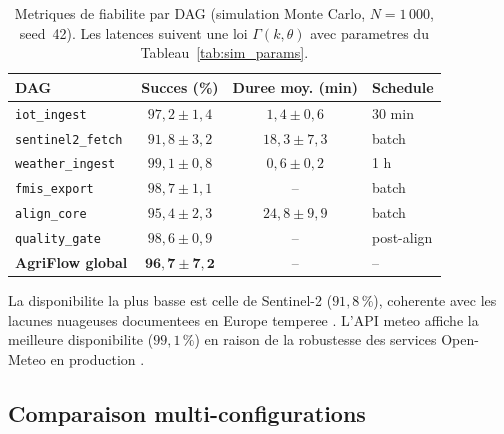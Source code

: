 \documentclass[12pt,a4paper]{article}
\theoremstyle{plain}
\theoremstyle{definition}
\theoremstyle{remark}
\begin{document}
	\begin{table}[H]
		\caption{Metriques de fiabilite par DAG (simulation Monte Carlo,
			$N=1\,000$, seed~42). Les latences suivent une loi
			$\Gamma(k,\theta)$ avec parametres du Tableau~\ref{tab:sim_params}.}
		\label{tab:reliability}
		\centering\small
		\renewcommand{\arraystretch}{1.38}
		\begin{tabularx}{\linewidth}{Xccl}
			\toprule
			\textbf{DAG} & \textbf{Succes (\%)} &
			\textbf{Duree moy. (min)} & \textbf{Schedule} \\
			\midrule
			\rowcolor{lightblue!30}
			\texttt{iot\_ingest}      & $97{,}2 \pm 1{,}4$ & $1{,}4 \pm 0{,}6$ & 30 min \\
			\texttt{sentinel2\_fetch} & $91{,}8 \pm 3{,}2$ & $18{,}3 \pm 7{,}3$ & batch \\
			\rowcolor{lightblue!30}
			\texttt{weather\_ingest}  & $99{,}1 \pm 0{,}8$ & $0{,}6 \pm 0{,}2$ & 1 h \\
			\texttt{fmis\_export}     & $98{,}7 \pm 1{,}1$ & -- & batch \\
			\rowcolor{lightblue!30}
			\texttt{align\_core}      & $95{,}4 \pm 2{,}3$ & $24{,}8 \pm 9{,}9$ & batch \\
			\texttt{quality\_gate}    & $98{,}6 \pm 0{,}9$ & -- & post-align \\
			\midrule
			\rowcolor{lightgreen!50}
			\textbf{AgriFlow global}  & $\mathbf{96{,}7 \pm 7{,}2}$ & -- & -- \\
			\bottomrule
		\end{tabularx}
	\end{table}
	
	La disponibilite la plus basse est celle de Sentinel-2
	($91{,}8\,\%$), coherente avec les lacunes nuageuses documentees
	en Europe temperee \cite{sentinel2_ard_2022}. L'API meteo affiche
	la meilleure disponibilite ($99{,}1\,\%$) en raison de la robustesse
	des services Open-Meteo en production \cite{openmeteo_uptime}.
	
	\subsection{Comparaison multi-configurations}
	
\end{document}
